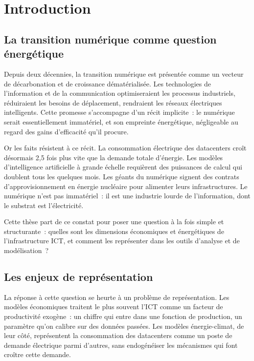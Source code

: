 
\chapter*{Introduction}\label{ch:introduction}

\section*{La transition numérique comme question énergétique}

Depuis deux décennies, la transition numérique est présentée comme un vecteur de décarbonation et de croissance dématérialisée. Les technologies de l'information et de la communication optimiseraient les processus industriels, réduiraient les besoins de déplacement, rendraient les réseaux électriques intelligents. Cette promesse s'accompagne d'un récit implicite~: le numérique serait essentiellement immatériel, et son empreinte énergétique, négligeable au regard des gains d'efficacité qu'il procure.

Or les faits résistent à ce récit. La consommation électrique des datacenters croît désormais 2,5 fois plus vite que la demande totale d'énergie. Les modèles d'intelligence artificielle à grande échelle requièrent des puissances de calcul qui doublent tous les quelques mois. Les géants du numérique signent des contrats d'approvisionnement en énergie nucléaire pour alimenter leurs infrastructures. Le numérique n'est pas immatériel~: il est une industrie lourde de l'information, dont le substrat est l'électricité.

Cette thèse part de ce constat pour poser une question à la fois simple et structurante~: quelles sont les dimensions économiques et énergétiques de l'infrastructure ICT, et comment les représenter dans les outils d'analyse et de modélisation~?

\section*{Les enjeux de représentation}

La réponse à cette question se heurte à un problème de représentation. Les modèles économiques traitent le plus souvent l'ICT comme un facteur de productivité exogène~: un chiffre qui entre dans une fonction de production, un paramètre qu'on calibre sur des données passées. Les modèles énergie-climat, de leur côté, représentent la consommation des datacenters comme un poste de demande électrique parmi d'autres, sans endogénéiser les mécanismes qui font croître cette demande.

